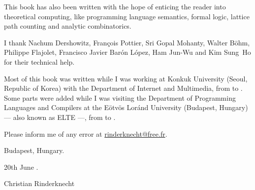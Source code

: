 This book has also been written with the hope of enticing the reader
into theoretical computing, like programming language semantics,
formal logic, lattice path counting and analytic combinatorics.

I thank Nachum Dershowitz, Fran\c{c}ois Pottier, Sri Gopal Mohanty,
Walter B\"ohm, Philippe Flajolet, Francisco Javier Bar\'on L\'opez,
Ham Jun-Wu and Kim Sung~Ho for their technical help.

Most of this book was written while I was working at Konkuk University
(Seoul, Republic of Korea) with the Department of Internet and
Multimedia, from  to . Some
parts were added while I was visiting the Department of Programming
Languages and Compilers at the E\"otv\"os Lor\'and University
(Budapest, Hungary) --- also known as ELTE ---, from
 to .

Please inform me of any error at \url{rinderknecht@free.fr}.

\bigskip

\hfill{}Budapest, Hungary.


\hfill{}20th June .

\bigskip

\hfill{}Christian Rinderknecht
